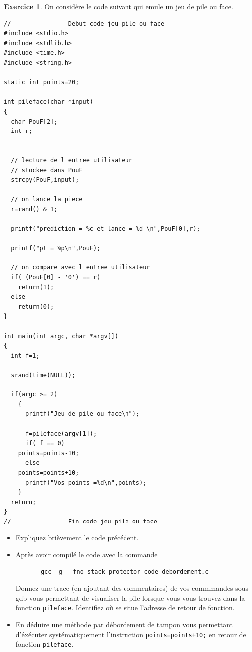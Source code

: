 \documentclass[a4paper,9pt]{article}
\theoremstyle{plain}
\theoremstyle{definition}
\newtheorem{exercice}{Exercice}
\begin{document}
\begin{exercice}
On considère le code suivant qui emule un jeu de pile ou face.
\begin{verbatim}
//--------------- Debut code jeu pile ou face ----------------
#include <stdio.h>
#include <stdlib.h>
#include <time.h>
#include <string.h>

static int points=20;

int pileface(char *input)
{
  char PouF[2];
  int r;

  
  // lecture de l entree utilisateur
  // stockee dans PouF
  strcpy(PouF,input);

  // on lance la piece
  r=rand() & 1;

  printf("prediction = %c et lance = %d \n",PouF[0],r);

  printf("pt = %p\n",PouF);

  // on compare avec l entree utilisateur
  if( (PouF[0] - '0') == r)
    return(1);
  else
    return(0);
}

int main(int argc, char *argv[])
{
  int f=1;
  
  srand(time(NULL));

  if(argc >= 2)
    {
      printf("Jeu de pile ou face\n");

      f=pileface(argv[1]);           
      if( f == 0)
	points=points-10;	     
      else
	points=points+10;
      printf("Vos points =%d\n",points);
    }	    
  return;
}
//--------------- Fin code jeu pile ou face ----------------
\end{verbatim}

%

\begin{itemize}
\item Expliquez brièvement  le code précédent.
\item Après avoir compilé le code avec la commande 
\begin{verbatim}
       gcc -g  -fno-stack-protector code-debordement.c
\end{verbatim}

Donnez une trace (en ajoutant des commentaires) de vos commmandes sous gdb  vous permettant de visualiser la pile lorsque vous vous trouvez dans la fonction \verb|pileface|. Identifiez où se situe l'adresse de retour de fonction.
\item En déduire une méthode par débordement de tampon vous permettant d'éxécuter systématiquement l'instruction \verb|points=points+10;| en retour de fonction \verb|pileface|.
\end{itemize}
\end{exercice}
\end{document}
